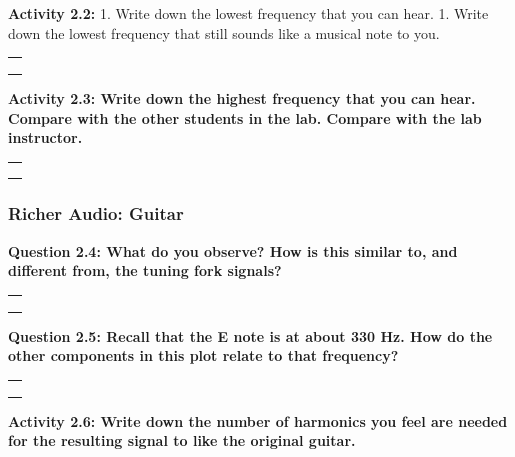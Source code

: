 \documentclass[11pt]{article}
\begin{document}
\textbf{Activity 2.2:} 1. Write down the lowest frequency that you can
hear. 1. Write down the lowest frequency that still sounds like a
musical note to you.

\begin{longtable}[]{@{}l@{}}
\toprule
 \\
\midrule
\endhead
 \\
 \\
 \\
\bottomrule
\end{longtable}

\textbf{Activity 2.3: Write down the highest frequency that you can
hear. Compare with the other students in the lab. Compare with the lab
instructor.}

\begin{longtable}[]{@{}l@{}}
\toprule
 \\
\midrule
\endhead
 \\
 \\
 \\
\bottomrule
\end{longtable}

\hypertarget{richer-audio-guitar}{%
\subsubsection*{Richer Audio: Guitar}\label{richer-audio-guitar}}

\textbf{Question 2.4: What do you observe? How is this similar to, and
different from, the tuning fork signals?}

\begin{longtable}[]{@{}l@{}}
\toprule
 \\
\midrule
\endhead
 \\
 \\
 \\
\bottomrule
\end{longtable}

\textbf{Question 2.5: Recall that the E note is at about 330 Hz. How do
the other components in this plot relate to that frequency?}

\begin{longtable}[]{@{}l@{}}
\toprule
 \\
\midrule
\endhead
 \\
 \\
 \\
\bottomrule
\end{longtable}

\textbf{Activity 2.6: Write down the number of harmonics you feel are
needed for the resulting signal to like the original guitar.}
\end{document}
